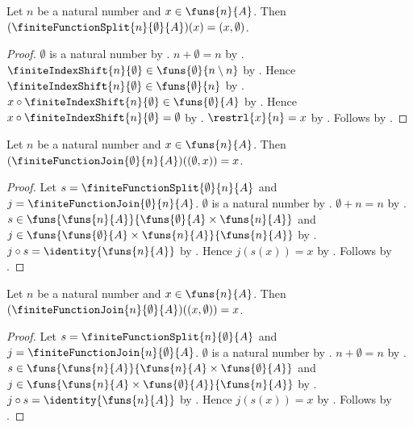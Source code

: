 \begin{proposition}\label{finite_function_split_zero_right_apply}
    Let $n$ be a natural number and $x\in\funs{n}{A}$.
    Then $(\finiteFunctionSplit{n}{\emptyset}{A})(x)=(x,\emptyset)$.
\end{proposition}
\begin{proof}
    $\emptyset$ is a natural number by .
    $n+\emptyset=n$ by .
    $\finiteIndexShift{n}{\emptyset}\in\funs{\emptyset}{n\setminus n}$ by
        .
    Hence $\finiteIndexShift{n}{\emptyset}\in\funs{\emptyset}{n}$ by
        .
    $x\circ\finiteIndexShift{n}{\emptyset}\in\funs{\emptyset}{A}$ by .
    Hence $x\circ\finiteIndexShift{n}{\emptyset}=\emptyset$ by
        .
    $\restrl{x}{n}=x$ by .
    Follows by .
\end{proof}

\begin{proposition}\label{finite_function_join_zero_left_apply}
    Let $n$ be a natural number and $x\in\funs{n}{A}$.
    Then $(\finiteFunctionJoin{\emptyset}{n}{A})((\emptyset,x))=x$.
\end{proposition}
\begin{proof}
    Let $s=\finiteFunctionSplit{\emptyset}{n}{A}$ and $j=\finiteFunctionJoin{\emptyset}{n}{A}$.
    $\emptyset$ is a natural number by .
    $\emptyset+n=n$ by .
    $s\in\funs{\funs{n}{A}}{\funs{\emptyset}{A}\times\funs{n}{A}}$ and
        $j\in\funs{\funs{\emptyset}{A}\times\funs{n}{A}}{\funs{n}{A}}$ by
        .
    $j\circ s=\identity{\funs{n}{A}}$ by .
    Hence $j(s(x))=x$ by .
    Follows by .
\end{proof}

\begin{proposition}\label{finite_function_join_zero_right_apply}
    Let $n$ be a natural number and $x\in\funs{n}{A}$.
    Then $(\finiteFunctionJoin{n}{\emptyset}{A})((x,\emptyset))=x$.
\end{proposition}
\begin{proof}
    Let $s=\finiteFunctionSplit{n}{\emptyset}{A}$ and $j=\finiteFunctionJoin{n}{\emptyset}{A}$.
    $\emptyset$ is a natural number by .
    $n+\emptyset=n$ by .
    $s\in\funs{\funs{n}{A}}{\funs{n}{A}\times\funs{\emptyset}{A}}$ and
        $j\in\funs{\funs{n}{A}\times\funs{\emptyset}{A}}{\funs{n}{A}}$ by
        .
    $j\circ s=\identity{\funs{n}{A}}$ by .
    Hence $j(s(x))=x$ by .
    Follows by .
\end{proof}

